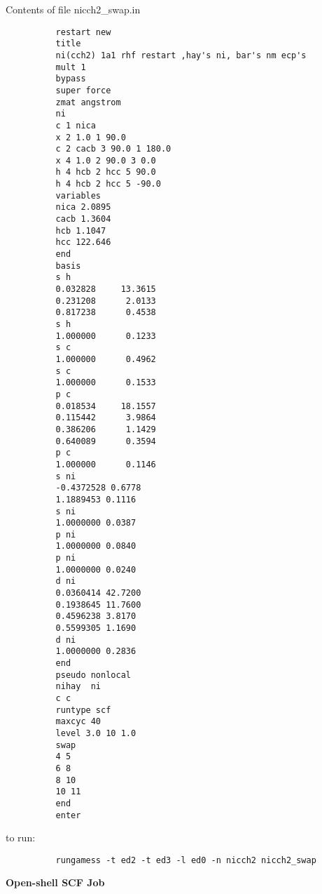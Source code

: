 \documentclass[11pt,fleqn]{article}
\begin{document}
Contents of file nicch2\_swap.in
{
\footnotesize
\begin{verbatim}
          restart new
          title
          ni(cch2) 1a1 rhf restart ,hay's ni, bar's nm ecp's
          mult 1
          bypass
          super force
          zmat angstrom
          ni
          c 1 nica
          x 2 1.0 1 90.0
          c 2 cacb 3 90.0 1 180.0
          x 4 1.0 2 90.0 3 0.0
          h 4 hcb 2 hcc 5 90.0
          h 4 hcb 2 hcc 5 -90.0
          variables
          nica 2.0895
          cacb 1.3604
          hcb 1.1047
          hcc 122.646
          end
          basis
          s h
          0.032828     13.3615
          0.231208      2.0133
          0.817238      0.4538
          s h
          1.000000      0.1233
          s c
          1.000000      0.4962
          s c
          1.000000      0.1533
          p c
          0.018534     18.1557
          0.115442      3.9864
          0.386206      1.1429
          0.640089      0.3594
          p c
          1.000000      0.1146
          s ni
          -0.4372528 0.6778
          1.1889453 0.1116
          s ni
          1.0000000 0.0387
          p ni
          1.0000000 0.0840
          p ni
          1.0000000 0.0240
          d ni
          0.0360414 42.7200
          0.1938645 11.7600
          0.4596238 3.8170
          0.5599305 1.1690
          d ni
          1.0000000 0.2836
          end
          pseudo nonlocal
          nihay  ni
          c c
          runtype scf
          maxcyc 40
          level 3.0 10 1.0
          swap
          4 5
          6 8
          8 10
          10 11
          end
          enter
\end{verbatim}
}
to run:
{
\footnotesize
\begin{verbatim}
          rungamess -t ed2 -t ed3 -l ed0 -n nicch2 nicch2_swap
\end{verbatim}
}
{\bf Open-shell SCF Job}\\
\end{document}
